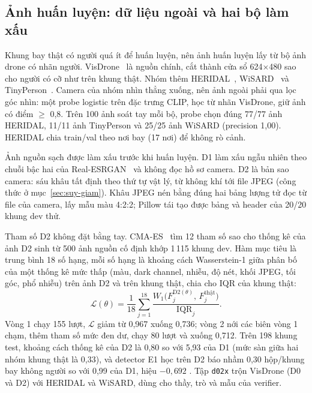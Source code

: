\subsection{Ảnh huấn luyện: dữ liệu ngoài và hai bộ làm xấu}

Khung bay thật có người quá ít để huấn luyện, nên ảnh huấn luyện lấy từ bộ ảnh drone có nhãn người. VisDrone~\cite{visdrone} là nguồn chính, cắt thành cửa sổ 624$\times$480 sao cho người có cỡ như trên khung thật. Nhóm thêm HERIDAL~\cite{heridal}, WiSARD~\cite{wisard} và TinyPerson~\cite{tinyperson}. Camera của nhóm nhìn thẳng xuống, nên ảnh ngoài phải qua lọc góc nhìn: một probe logistic trên đặc trưng CLIP, học từ nhãn VisDrone, giữ ảnh có điểm $\geq$ 0,8. Trên 100 ảnh soát tay mỗi bộ, probe chọn đúng 77/77 ảnh HERIDAL, 11/11 ảnh TinyPerson và 25/25 ảnh WiSARD (precision 1,00). HERIDAL chia train/val theo nơi bay (17 nơi) để không rò cảnh.

Ảnh nguồn sạch được làm xấu trước khi huấn luyện. D1 làm xấu ngẫu nhiên theo chuỗi bậc hai của Real-ESRGAN~\cite{realesrgan} và không đọc hồ sơ camera. D2 là bản sao camera: sáu khâu tất định theo thứ tự vật lý, từ không khí tới file JPEG (công thức ở mục~\ref{sec:suy-giam}). Khâu JPEG nén bằng đúng hai bảng lượng tử đọc từ file của camera, lấy mẫu màu 4:2:2; Pillow tái tạo được bảng và header của 20/20 khung dev thử.

Tham số D2 không đặt bằng tay. CMA-ES~\cite{cmaes} tìm 12 tham số sao cho thống kê của ảnh D2 sinh từ 500 ảnh nguồn cố định khớp 1\,115 khung dev. Hàm mục tiêu là trung bình 18 số hạng, mỗi số hạng là khoảng cách Wasserstein-1 giữa phân bố của một thống kê mức thấp (màu, dark channel, nhiễu, độ nét, khối JPEG, tối góc, phổ nhiễu) trên ảnh D2 và trên khung thật, chia cho IQR của khung thật:
\begin{equation}
\mathcal{L}(\theta)=\frac{1}{18}\sum_{j=1}^{18}\frac{W_1\!\big(F_j^{\mathrm{D2}(\theta)},\,F_j^{\mathrm{thật}}\big)}{\mathrm{IQR}_j}.
\label{eq:cmaes}
\end{equation}
Vòng 1 chạy 155 lượt, $\mathcal{L}$ giảm từ 0,967 xuống 0,736; vòng 2 nới các biên vòng 1 chạm, thêm tham số mức đen dư, chạy 80 lượt và xuống 0,712. Trên 198 khung test, khoảng cách thống kê của D2 là 0,80 so với 5,93 của D1 (mức sàn giữa hai nhóm khung thật là 0,33), và detector E1 học trên D2 báo nhầm 0,30 hộp/khung bay không người so với 0,99 của D1, hiệu $-0{,}692$ . Tập \texttt{d02x} trộn VisDrone (D0 và D2) với HERIDAL và WiSARD, dùng cho thầy, trò và mẫu của verifier.
